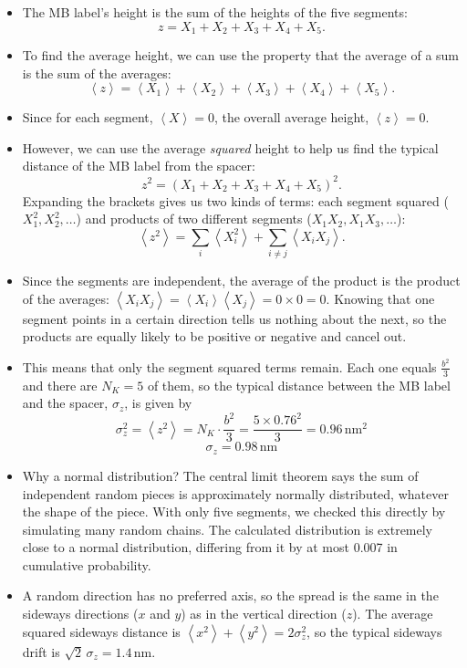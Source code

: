 \documentclass[10pt,a4paper]{article}
\numberwithin{equation}{section}
\newcommand{\nm}{\,\mathrm{nm}}
\newcommand{\avg}[1]{\left\langle #1\right\rangle}
\newcommand{\dropdown}{\par\medskip}
\begin{document}
\dropdown
\begin{itemize}
  \item The MB label's height is the sum of the heights of the five segments:
  \[ z = X_1 + X_2 + X_3 + X_4 + X_5. \]
  \item To find the average height, we can use the property that the average of a sum is the sum of the averages:
  \[ \avg{z} = \avg{X_1} + \avg{X_2} + \avg{X_3} + \avg{X_4} + \avg{X_5}. \]
  \item Since for each segment, $\avg{X} = 0$, the overall average height, $\avg{z} = 0$.
  \item However, we can use the average \emph{squared} height to help us find the typical distance of the MB label from the spacer:
  \[ z^2 = (X_1 + X_2 + X_3 + X_4 + X_5)^2. \]
  Expanding the brackets gives us two kinds of terms: each segment squared ($X_1^2, X_2^2, \dots$) and products of two different segments ($X_1X_2, X_1X_3, \dots$):
  \[ \avg{z^2} = \sum_i\avg{X_i^2} + \sum_{i\neq j}\avg{X_iX_j}. \]
  \item Since the segments are independent, the average of the product is the product of the averages: $\avg{X_iX_j} = \avg{X_i}\avg{X_j} = 0\times0 = 0$. Knowing that one segment points in a certain direction tells us nothing about the next, so the products are equally likely to be positive or negative and cancel out.
  \item This means that only the segment squared terms remain. Each one equals $\frac{b^2}{3}$ and there are $N_K = 5$ of them, so the typical distance between the MB label and the spacer, $\sigma_z$, is given by
  \[ \sigma_z^2 = \avg{z^2} = N_K\cdot\frac{b^2}{3} = \frac{5\times0.76^2}{3} = 0.96\,\mathrm{nm^2} \]
  \[ \sigma_z = 0.98\nm \]
  \item Why a normal distribution? The central limit theorem says the sum of independent random pieces is approximately normally distributed, whatever the shape of the piece. With only five segments, we checked this directly by simulating many random chains. The calculated distribution is extremely close to a normal distribution, differing from it by at most 0.007 in cumulative probability.
  \item A random direction has no preferred axis, so the spread is the same in the sideways directions ($x$ and $y$) as in the vertical direction ($z$). The average squared sideways distance is $\avg{x^2} + \avg{y^2} = 2\sigma_z^2$, so the typical sideways drift is $\sqrt{2}\,\sigma_z = 1.4\nm$.
\end{itemize}
\end{document}
